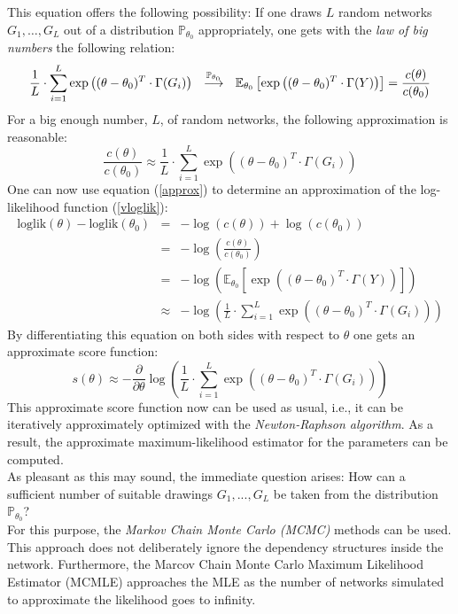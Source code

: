 \documentclass[headsepline=true, abstracton]{scrartcl}
\begin{document}
%
This equation offers the following possibility: If one draws $L$ random networks $G_1, \dots ,G_L$ out of a distribution $\mathbb{P}_{\theta_0}$ appropriately, one gets with the \textit{law of big numbers} the following relation:
%
\begin{equation}
\frac{1}{L}\cdot \sum_{i=1}^{L}  \exp\left((\theta - \theta_0)^T \cdot \Gamma(G_i)\right)
~~\stackrel {{\tiny\mathbb{P}_{\theta_0}}}{\longrightarrow}~~ \mathbb{E}_{\theta_0}\left[ \exp\left((\theta - \theta_0)^T \cdot \Gamma(Y)\right) \right] = \frac{c(\theta)}{c(\theta_0)}
\label{konver}
\end{equation}
%
For a big enough number, $L$, of random networks, the following approximation is reasonable:
%
\begin{equation}
\frac{c(\theta)}{c(\theta_0)} \approx \frac{1}{L}\cdot \sum_{i=1}^{L}  \exp\left((\theta - \theta_0)^T \cdot \Gamma(G_i)\right)
\label{approx}
\end{equation}
%
One can now use equation (\ref{approx}) to determine an approximation of the log-likelihood function (\ref{vloglik}):
%
\begin{eqnarray*}
\text{loglik}(\theta)-\text{loglik}(\theta_0)&=&- \log(c(\theta))+\log(c(\theta_0))\\
                                             &=&- \log \left( \frac{c(\theta)}{c(\theta_0)} \right)\\
                                             &=&- \log \left( \mathbb{E}_{\theta_0}\left[ \exp\left((\theta - \theta_0)^T \cdot \Gamma(Y)\right) \right] \right)\\
                                             &\approx &- \log \left( \frac{1}{L} \cdot \sum_{i=1}^{L}  \exp \left((\theta - \theta_0)^T \cdot \Gamma(G_i) \right) \right)
\end{eqnarray*}
%
By differentiating this equation on both sides with respect to $\theta$ one gets an approximate score function:
%
\begin{equation}
s(\theta) \approx -\frac{\partial}{\partial \theta} \log \left( \frac{1}{L} \cdot \sum_{i=1}^{L}  \exp \left((\theta - \theta_0)^T \cdot \Gamma(G_i) \right) \right)
\label{score}
\end{equation}
%
This approximate score function now can be used as usual, i.e., it can be iteratively approximately optimized with the \textit{Newton-Raphson algorithm}. As a result, the approximate maximum-likelihood estimator for the parameters can be computed.\\[0.4cm]
As pleasant as this may sound, the immediate question arises: How can a sufficient number of suitable drawings $G_1,...,G_L$ be taken from the distribution $\mathbb{P}_{\theta_0}$? \\
For this purpose, the \textit{Markov Chain Monte Carlo (MCMC)} methods can be used. This approach does not deliberately ignore the dependency structures inside the network. Furthermore, the Marcov Chain Monte Carlo Maximum Likelihood Estimator (MCMLE) approaches the MLE as the number of networks simulated to approximate the likelihood goes to infinity.\\[0.3cm]
\end{document}

